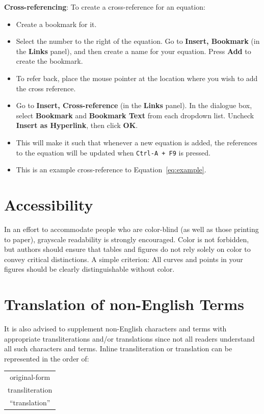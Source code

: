 \documentclass[11pt,a4paper]{article}
\begin{document}
\textbf{Cross-referencing}: To create a cross-reference for an equation:

\begin{itemize}
    \item Create a bookmark for it.
    \item Select the number to the right of the equation. Go to \textbf{Insert, Bookmark} (in the \textbf{Links} panel), and then create a name for your equation. Press \textbf{Add} to create the bookmark.
    \item To refer back, place the mouse pointer at the location where you wish to add the cross reference.
    \item Go to \textbf{Insert, Cross-reference} (in the \textbf{Links} panel). In the dialogue box, select \textbf{Bookmark} and \textbf{Bookmark Text} from each dropdown list. Uncheck \textbf{Insert as Hyperlink}, then click \textbf{OK}.
    \item This will make it such that whenever a new equation is added, the references to the equation will be updated when \texttt{Ctrl-A + F9} is pressed.
    \item This is an example cross-reference to Equation~\ref{eq:example}.
\end{itemize}

\section{Accessibility}
\label{ssec:accessibility}

In an effort to accommodate people who are color-blind (as well as those printing to paper), grayscale readability is strongly encouraged.
Color is not forbidden, but authors should ensure that tables and figures do not rely solely on color to convey critical distinctions.
A simple criterion:
All curves and points in your figures should be clearly distinguishable without color.

\section{Translation of non-English Terms}

It is also advised to supplement non-English characters and terms with appropriate transliterations and/or translations since not all readers understand all such characters and terms.
Inline transliteration or translation can be represented in the order of:
\begin{center}
\begin{tabular}{c}
original-form \\
transliteration \\
``translation''
\end{tabular}
\end{center}
\end{document}
